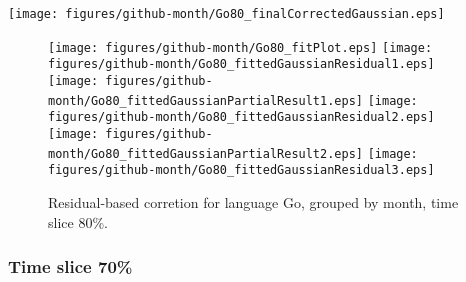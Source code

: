 \begin{center}
{\texttt{[image: figures/github-month/Go80\_finalCorrectedGaussian.eps]}}
\end{center}

\FloatBarrier

\begin{figure}[t]
\centering
{}
{\texttt{[image: figures/github-month/Go80\_fitPlot.eps]}}
{\texttt{[image: figures/github-month/Go80\_fittedGaussianResidual1.eps]}}
{\texttt{[image: figures/github-month/Go80\_fittedGaussianPartialResult1.eps]}}
{\texttt{[image: figures/github-month/Go80\_fittedGaussianResidual2.eps]}}
{\texttt{[image: figures/github-month/Go80\_fittedGaussianPartialResult2.eps]}}
{\texttt{[image: figures/github-month/Go80\_fittedGaussianResidual3.eps]}}
\caption{Residual-based corretion for language Go, grouped by month, time slice 80\%.}
\end{figure}


\FloatBarrier


\subsubsection{Time slice 70\%}

